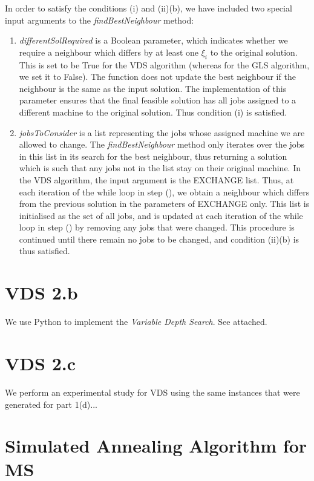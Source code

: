 \documentclass[12pt,a4paper,reqno]{article}
\begin{document}
In order to satisfy the conditions (i) and (ii)(b), we have included two special input arguments to the \textit{findBestNeighbour} method:
\begin{enumerate}
\item \textit{differentSolRequired} is a Boolean parameter, which indicates whether we require a neighbour which differs by at least one $\xi_i$ to the original solution. This is set to be True for the VDS algorithm (whereas for the GLS algorithm, we set it to False). The function does not update the best neighbour if the neighbour is the same as the input solution. The implementation of this parameter ensures that the final feasible solution has all jobs assigned to a different machine to the original solution. Thus condition (i) is satisfied.
\item \textit{jobsToConsider} is a list representing the jobs whose assigned machine we are allowed to change. The \textit{findBestNeighbour} method only iterates over the jobs in this list in its search for the best neighbour, thus returning a solution which is such that any jobs not in the list stay on their original machine. In the VDS algorithm, the input argument is the EXCHANGE list. Thus, at each iteration of the while loop in step (), we obtain a neighbour which differs from the previous solution in the parameters of EXCHANGE only. This list is initialised as the set of all jobs, and is updated at each iteration of the while loop in step () by removing any jobs that were changed. This procedure is continued until there remain no jobs to be changed, and condition (ii)(b) is thus satisfied.
\end{enumerate}

\section*{VDS 2.b}
We use Python to implement the \emph{Variable Depth Search}. See attached.

\section*{VDS 2.c}
We perform an experimental study for VDS using the same instances that were generated for part 1(d)...

\newpage
\section{Simulated Annealing Algorithm for MS}
\end{document}
